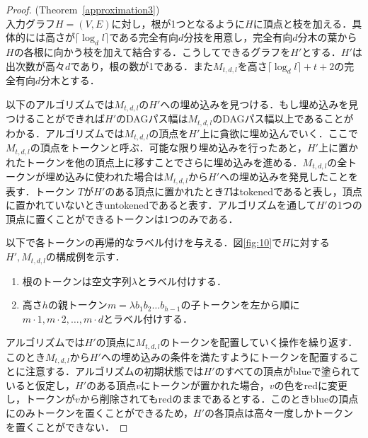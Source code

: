 \documentclass[master]{kuisthesis}		%
\theoremstyle{plain}
\theoremstyle{definition}
\begin{document}
\begin{proof}(Theorem~\ref{approximation3})\\
入力グラフ$H = (V, E)$に対し，根が1つとなるように$H$に頂点と枝を加える．具体的には高さが$\lceil \log_d l \rceil$である完全有向$d$分技を用意し，完全有向$d$分木の葉から$H$の各根に向かう枝を加えて結合する．こうしてできるグラフを$H'$とする．$H'$は出次数が高々$d$であり，根の数が1である．また$M_{t, d, l}$を高さ$\lceil \log_d l \rceil +t+2$の完全有向$d$分木とする．

以下のアルゴリズムでは$M_{t, d, l}$の$H'$への埋め込みを見つける．もし埋め込みを見つけることができれば$H'$のDAGパス幅は$M_{t, d, l}$のDAGパス幅以上であることがわかる．アルゴリズムでは$M_{t, d, l}$の頂点を$H'$上に貪欲に埋め込んでいく．ここで$M_{t, d, l}$の頂点をトークンと呼ぶ．可能な限り埋め込みを行ったあと，$H'$上に置かれたトークンを他の頂点上に移すことでさらに埋め込みを進める．$M_{t, d, l}$の全トークンが埋め込みに使われた場合は$M_{t, d, l}$から$H'$への埋め込みを発見したことを表す．トークン $T$が$H'$のある頂点に置かれたとき$T$はtokenedであると表し，頂点に置かれていないときuntokenedであると表す．アルゴリズムを通して$H'$の1つの頂点に置くことができるトークンは1つのみである．

以下で各トークンの再帰的なラベル付けを与える．図\ref{fig:10}で$H$に対する$H', M_{t, d, l}$の構成例を示す．

\begin{enumerate}
    \item 根のトークンは空文字列$\lambda$とラベル付けする．
    \item 高さ$h$の親トークン$m=\lambda b_1 b_2 \dots b_{h-1}$の子トークンを左から順に$m \cdot 1, m \cdot 2, \dots , m \cdot d$とラベル付けする．
\end{enumerate}

アルゴリズムでは$H'$の頂点に$M_{t, d, l}$のトークンを配置していく操作を繰り返す．このとき$M_{t, d, l}$から$H'$への埋め込みの条件を満たすようにトークンを配置することに注意する．アルゴリズムの初期状態では$H'$のすべての頂点がblueで塗られていると仮定し，$H'$のある頂点$v$にトークンが置かれた場合，$v$の色をredに変更し，トークンが$v$から削除されてもredのままであるとする．このときblueの頂点にのみトークンを置くことができるため，$H'$の各頂点は高々一度しかトークンを置くことができない．



\end{proof}
\end{document}
